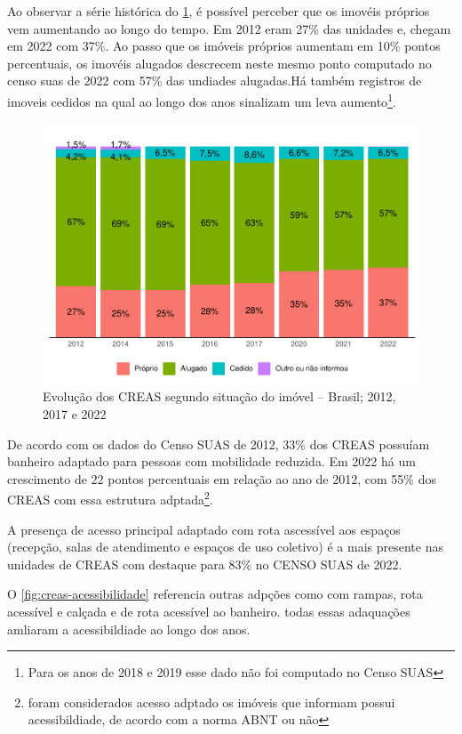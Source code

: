 \documentclass[
  brazilian]{report}
\begin{document}
Ao observar a série histórica do \cref{fig:creas-situacao}, é possível
perceber que os imovéis próprios vem aumentando ao longo do tempo. Em
2012 eram 27\% das unidades e, chegam em 2022 com 37\%. Ao passo que os
imóveis próprios aumentam em 10\% pontos percentuais, os imovéis
alugados descrecem neste mesmo ponto computado no censo suas de 2022 com
57\% das undiades alugadas.Há também registros de imoveis cedidos na
qual ao longo dos anos sinalizam um leva
aumento\footnote{Para os anos de 2018 e 2019 esse dado não foi computado no Censo SUAS}.

\begin{figure}
\includegraphics{Censo-SUAS-2022_files/figure-latex/creas-situacao-1} \caption[Evolução dos CREAS segundo situação do imóvel – Brasil]{Evolução dos CREAS segundo situação do imóvel – Brasil; 2012, 2017 e 2022}\label{fig:creas-situacao}
\end{figure}

De acordo com os dados do Censo SUAS de 2012, 33\% dos CREAS possuíam
banheiro adaptado para pessoas com mobilidade reduzida. Em 2022 há um
crescimento de 22 pontos percentuais em relação ao ano de 2012, com 55\%
dos CREAS com essa estrutura
adptada\footnote{foram considerados acesso adptado os imóveis que informam possui acessibildiade, de acordo com a norma ABNT ou não}.

A presença de acesso principal adaptado com rota ascessível aos espaços
(recepção, salas de atendimento e espaços de uso coletivo) é a mais
presente nas unidades de CREAS com destaque para 83\% no CENSO SUAS de
2022.

O \cref{fig:creas-acessibilidade} referencia outras adpções como com
rampas, rota acessível e calçada e de rota acessível ao banheiro. todas
essas adaquações amliaram a acessibildiade ao longo dos anos.
\end{document}
